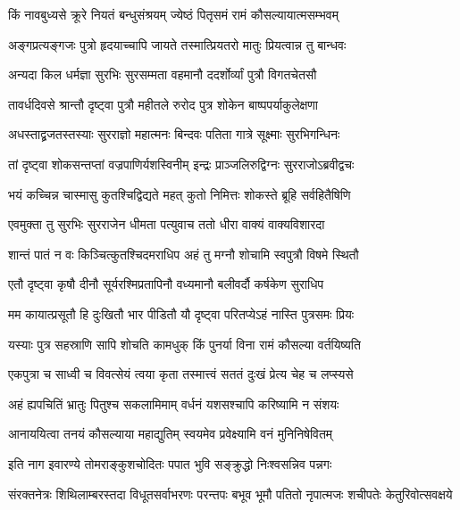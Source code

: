 \twolineshloka
{किं नावबुध्यसे क्रूरे नियतं बन्धुसंश्रयम्}
{ज्येष्ठं पितृसमं रामं कौसल्यायात्मसम्भवम्} %

\twolineshloka
{अङ्गप्रत्यङ्गजः पुत्रो हृदयाच्चापि जायते}
{तस्मात्प्रियतरो मातुः प्रियत्वान्न तु बान्धवः} %

\twolineshloka
{अन्यदा किल धर्मज्ञा सुरभिः सुरसम्मता}
{वहमानौ ददर्शोर्व्यां पुत्रौ विगतचेतसौ} %

\twolineshloka
{तावर्धदिवसे श्रान्तौ दृष्ट्वा पुत्रौ महीतले}
{रुरोद पुत्र शोकेन बाष्पपर्याकुलेक्षणा} %

\twolineshloka
{अधस्ताद्व्रजतस्तस्याः सुरराज्ञो महात्मनः}
{बिन्दवः पतिता गात्रे सूक्ष्माः सुरभिगन्धिनः} %

\twolineshloka
{तां दृष्ट्वा शोकसन्तप्तां वज्रपाणिर्यशस्विनीम्}
{इन्द्रः प्राञ्जलिरुद्विग्नः सुरराजोऽब्रवीद्वचः} %

\twolineshloka
{भयं कच्चिन्न चास्मासु कुतश्चिद्विद्यते महत्}
{कुतो निमित्तः शोकस्ते ब्रूहि सर्वहितैषिणि} %

\twolineshloka
{एवमुक्ता तु सुरभिः सुरराजेन धीमता}
{पत्युवाच ततो धीरा वाक्यं वाक्यविशारदा} %

\twolineshloka
{शान्तं पातं न वः किञ्चित्कुतश्चिदमराधिप}
{अहं तु मग्नौ शोचामि स्वपुत्रौ विषमे स्थितौ} %

\twolineshloka
{एतौ दृष्ट्वा कृषौ दीनौ सूर्यरश्मिप्रतापिनौ}
{वध्यमानौ बलीवर्दौ कर्षकेण सुराधिप} %

\twolineshloka
{मम कायात्प्रसूतौ हि दुःखितौ भार पीडितौ}
{यौ दृष्ट्वा परितप्येऽहं नास्ति पुत्रसमः प्रियः} %

\twolineshloka
{यस्याः पुत्र सहस्राणि सापि शोचति कामधुक्}
{किं पुनर्या विना रामं कौसल्या वर्तयिष्यति} %

\twolineshloka
{एकपुत्रा च साध्वी च विवत्सेयं त्वया कृता}
{तस्मात्त्वं सततं दुःखं प्रेत्य चेह च लप्स्यसे} %

\twolineshloka
{अहं ह्यपचितिं भ्रातुः पितुश्च सकलामिमाम्}
{वर्धनं यशसश्चापि करिष्यामि न संशयः} %

\twolineshloka
{आनाययित्वा तनयं कौसल्याया महाद्युतिम्}
{स्वयमेव प्रवेक्ष्यामि वनं मुनिनिषेवितम्} %

\twolineshloka
{इति नाग इवारण्ये तोमराङ्कुशचोदितः}
{पपात भुवि सङ्क्रुद्धो निःश्वसन्निव पन्नगः} %

\fourlineindentedshloka
{संरक्तनेत्रः शिथिलाम्बरस्तदा}
{विधूतसर्वाभरणः परन्तपः}
{बभूव भूमौ पतितो नृपात्मजः}
{शचीपतेः केतुरिवोत्सवक्षये} %


